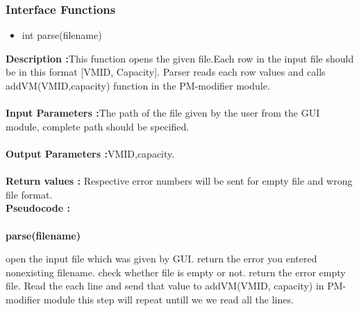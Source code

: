\documentclass[a4paper,11pt]{article}
\begin{document}
\subsubsection{Interface Functions}
\begin{itemize}
\item int parse(filename)
\end{itemize}
\textbf{Description :}This function opens the given file.Each row in the input file should be in this format [VM\textunderscore ID, Capacity]. Parser reads each row values and calls addVM(VM\textunderscore ID,capacity) function in the PM-modifier module.\\
\\
\textbf{Input Parameters :}The path of the file given by the user from the GUI module, complete path should be specified.\\
\\
\textbf{Output Parameters :}VM\textunderscore ID,capacity.\\
\\
\textbf{Return values :} Respective error numbers will be sent for empty file and wrong file format.
\pagebreak
\\
\textbf{Pseudocode :}\\
\\
\textbf{parse(filename)}
\begin{algorithmic}[1]
\STATE open the input file which was given by GUI. 
\STATE return the error you entered nonexisting filename.
\ENDIF
\STATE check whether file is empty or not.
\STATE return the error empty file.
\ELSE
\STATE Read the each line and send that value to addVM(VM\textunderscore ID, capacity) in PM-modifier module
\STATE this step will repeat untill we we read all the lines.
\ENDIF

\end{algorithmic}
\end{document}
